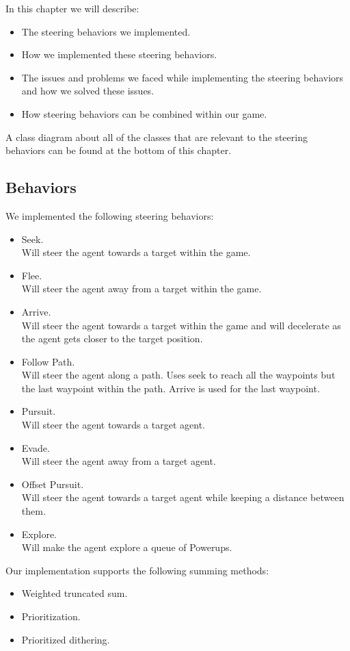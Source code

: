 In this chapter we will describe: 
\begin{itemize}
	\item The steering behaviors we implemented.
	\item How we implemented these steering behaviors.
	\item The issues and problems we faced while implementing the steering behaviors and how we solved these issues.
	\item How steering behaviors can be combined within our game.
\end{itemize}
A class diagram about all of the classes that are relevant to the steering behaviors can be found at the bottom of this chapter.
\subsection{Behaviors}
We implemented the following steering behaviors: 
\begin{itemize}
	\item Seek. \\ 
	Will steer the agent towards a target within the game.
	\item Flee. \\
	Will steer the agent away from a target within the game.
	\item Arrive. \\
	Will steer the agent towards a target within the game and will decelerate as the agent gets closer to the target position.
	\item Follow Path. \\ 
	Will steer the agent along a path. 
	Uses seek to reach all the waypoints but the last waypoint within the path. 
	Arrive is used for the last waypoint.
	\item Pursuit. \\
	Will steer the agent towards a target agent.
	\item Evade. \\ 
	Will steer the agent away from a target agent.
	\item Offset Pursuit. \\
	Will steer the agent towards a target agent while keeping a distance between them.
	\item Explore. \\
	Will make the agent explore a queue of Powerups.
\end{itemize}
Our implementation supports the following summing methods: 
\begin{itemize}
	\item Weighted truncated sum.
	\item Prioritization.
	\item Prioritized dithering.
\end{itemize}
